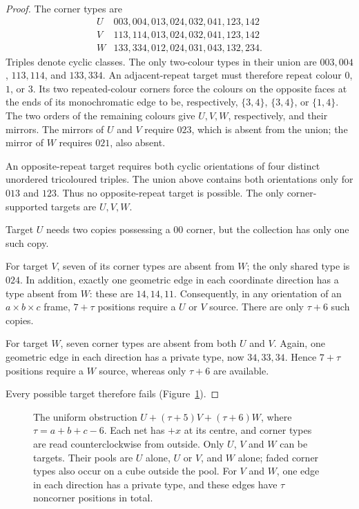 \begin{proof}
The corner types are
\[
\begin{array}{c|l}
 U&003,004,013,024,032,041,123,142\\
 V&113,114,013,024,032,041,123,142\\
 W&133,334,012,024,031,043,132,234.
\end{array}
\]
Triples denote cyclic classes. The only two-colour types in their union
are $003,004$, $113,114$, and $133,334$. An adjacent-repeat target must
therefore repeat colour $0$, $1$, or $3$. Its two repeated-colour corners
force the colours on the opposite faces at the ends of its monochromatic
edge to be, respectively, $\{3,4\}$, $\{3,4\}$, or $\{1,4\}$.
The two orders of the remaining colours give $U,V,W$, respectively, and
their mirrors. The mirrors of $U$ and $V$ require $023$, which is absent
from the union; the mirror of $W$ requires $021$, also absent.

An opposite-repeat target requires both cyclic orientations of four
distinct unordered tricoloured triples. The union above contains both
orientations only for $013$ and $123$. Thus no opposite-repeat target
is possible. The only corner-supported targets are $U,V,W$.

Target $U$ needs two copies possessing a $00$ corner, but the collection
has only one such copy.

For target $V$, seven of its corner types are absent from $W$; the only
shared type is $024$. In addition, exactly one geometric edge in each
coordinate direction has a type absent from $W$: these are $14,14,11$.
Consequently, in any orientation of an $a\times b\times c$ frame,
$7+\tau$ positions require a $U$ or $V$ source. There are only $\tau+6$
such copies.

For target $W$, seven corner types are absent from both $U$ and $V$.
Again, one geometric edge in each direction has a private type, now
$34,33,34$. Hence $7+\tau$ positions require a $W$ source, whereas only
$\tau+6$ are available.

Every possible target therefore fails
(Figure~\ref{fig:uniform-obstruction}).
\end{proof}

\begin{figure}[ht]
\centering

\caption{The uniform obstruction $U+(\tau+5)V+(\tau+6)W$, where $\tau=a+b+c-6$.
Each net has $+x$ at its centre, and corner types are read
counterclockwise from outside. Only $U$, $V$ and $W$ can be targets.
Their pools are $U$ alone, $U$ or $V$, and $W$ alone; faded corner types
also occur on a cube outside the pool. For $V$ and $W$, one edge in each
direction has a private type, and these edges have $\tau$ noncorner positions
in total.}
\label{fig:uniform-obstruction}
\end{figure}

